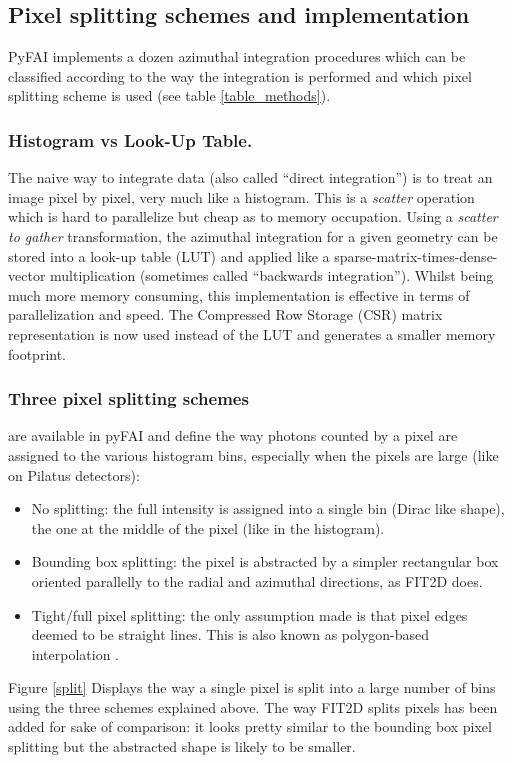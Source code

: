 \documentclass{iucr}
\begin{document}
\subsection{Pixel splitting schemes and implementation}

PyFAI implements a dozen azimuthal integration procedures which can be
classified according to the way the integration is performed and which pixel
splitting scheme is used (see table \ref{table_methods}).

\subsubsection{Histogram vs Look-Up Table.}
The naive way to integrate data (also called ``direct integration'') is to treat
an image pixel by pixel, very much like a histogram.
This is a \textit{scatter} operation which is hard to parallelize but cheap as
to memory occupation.
Using a \textit{scatter to gather} transformation, the azimuthal integration for
a given geometry can be stored into a look-up table (LUT) and applied like a
sparse-matrix-times-dense-vector multiplication (sometimes called
``backwards integration'').
Whilst being much more memory consuming, this
implementation is effective in terms of parallelization and speed.
The Compressed Row Storage (CSR) matrix representation is now used instead of
the LUT and generates a smaller memory footprint.

\subsubsection{Three pixel splitting schemes} are available in pyFAI and define
the way photons counted by a pixel are assigned to the various histogram bins,
especially when the pixels are large (like on Pilatus detectors):
\begin{itemize}
\item No splitting: the full intensity is assigned into a single bin (Dirac
like shape), the one at the middle of the pixel (like in the histogram).
\item Bounding box splitting: the pixel is abstracted by a simpler rectangular box
oriented parallelly to the radial and azimuthal directions, as FIT2D does.
\item
Tight/full pixel splitting: the only assumption made is that pixel
edges deemed to be straight lines. This is also known as polygon-based
interpolation \cite{stefanvdw}.
\end{itemize}
Figure \ref{split} Displays the way a single pixel is split into a
large number of bins using the three schemes explained above.
The way FIT2D splits pixels has been added for sake of comparison: it looks
pretty similar to the bounding box pixel splitting but the abstracted shape is
likely to be smaller.
\end{document}
